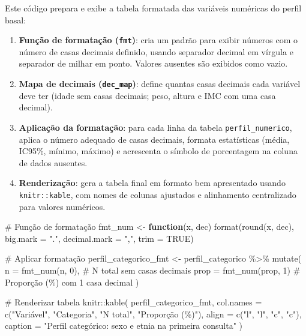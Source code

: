 \documentclass[
]{article}
\newenvironment{Shaded}{\begin{snugshade}}{\end{snugshade}}
\newcommand{\AttributeTok}[1]{\textcolor[rgb]{0.40,0.45,0.13}{#1}}
\newcommand{\CommentTok}[1]{\textcolor[rgb]{0.37,0.37,0.37}{#1}}
\newcommand{\ConstantTok}[1]{\textcolor[rgb]{0.56,0.35,0.01}{#1}}
\newcommand{\ControlFlowTok}[1]{\textcolor[rgb]{0.00,0.23,0.31}{\textbf{#1}}}
\newcommand{\DecValTok}[1]{\textcolor[rgb]{0.68,0.00,0.00}{#1}}
\newcommand{\FunctionTok}[1]{\textcolor[rgb]{0.28,0.35,0.67}{#1}}
\newcommand{\NormalTok}[1]{\textcolor[rgb]{0.00,0.23,0.31}{#1}}
\newcommand{\OtherTok}[1]{\textcolor[rgb]{0.00,0.23,0.31}{#1}}
\newcommand{\SpecialCharTok}[1]{\textcolor[rgb]{0.37,0.37,0.37}{#1}}
\newcommand{\StringTok}[1]{\textcolor[rgb]{0.13,0.47,0.30}{#1}}
\begin{document}
Este código prepara e exibe a tabela formatada das variáveis numéricas
do perfil basal:

\begin{enumerate}
\def\labelenumi{\arabic{enumi}.}
\item
  \textbf{Função de formatação (\texttt{fmt})}: cria um padrão para
  exibir números com o número de casas decimais definido, usando
  separador decimal em vírgula e separador de milhar em ponto. Valores
  ausentes são exibidos como vazio.
\item
  \textbf{Mapa de decimais (\texttt{dec\_map})}: define quantas casas
  decimais cada variável deve ter (idade sem casas decimais; peso,
  altura e IMC com uma casa decimal).
\item
  \textbf{Aplicação da formatação}: para cada linha da tabela
  \texttt{perfil\_numerico}, aplica o número adequado de casas decimais,
  formata estatísticas (média, IC95\%, mínimo, máximo) e acrescenta o
  símbolo de porcentagem na coluna de dados ausentes.
\item
  \textbf{Renderização}: gera a tabela final em formato bem apresentado
  usando \texttt{knitr::kable}, com nomes de colunas ajustados e
  alinhamento centralizado para valores numéricos.
\end{enumerate}

\begin{Shaded}
\begin{Highlighting}[]
\CommentTok{\# Função de formatação}
\NormalTok{fmt\_num }\OtherTok{\textless{}{-}} \ControlFlowTok{function}\NormalTok{(x, dec) }\FunctionTok{format}\NormalTok{(}\FunctionTok{round}\NormalTok{(x, dec), }\AttributeTok{big.mark =} \StringTok{"."}\NormalTok{, }\AttributeTok{decimal.mark =} \StringTok{","}\NormalTok{, }\AttributeTok{trim =} \ConstantTok{TRUE}\NormalTok{)}

\CommentTok{\# Aplicar formatação}
\NormalTok{perfil\_categorico\_fmt }\OtherTok{\textless{}{-}}\NormalTok{ perfil\_categorico }\SpecialCharTok{\%\textgreater{}\%}
  \FunctionTok{mutate}\NormalTok{(}
    \AttributeTok{n    =} \FunctionTok{fmt\_num}\NormalTok{(n, }\DecValTok{0}\NormalTok{),   }\CommentTok{\# N total sem casas decimais}
    \AttributeTok{prop =} \FunctionTok{fmt\_num}\NormalTok{(prop, }\DecValTok{1}\NormalTok{) }\CommentTok{\# Proporção (\%) com 1 casa decimal}
\NormalTok{  )}

\CommentTok{\# Renderizar tabela}
\NormalTok{knitr}\SpecialCharTok{::}\FunctionTok{kable}\NormalTok{(}
\NormalTok{  perfil\_categorico\_fmt,}
  \AttributeTok{col.names =} \FunctionTok{c}\NormalTok{(}\StringTok{"Variável"}\NormalTok{, }\StringTok{"Categoria"}\NormalTok{, }\StringTok{"N total"}\NormalTok{, }\StringTok{"Proporção (\%)"}\NormalTok{),}
  \AttributeTok{align =} \FunctionTok{c}\NormalTok{(}\StringTok{"l"}\NormalTok{, }\StringTok{"l"}\NormalTok{, }\StringTok{"c"}\NormalTok{, }\StringTok{"c"}\NormalTok{),}
  \AttributeTok{caption =} \StringTok{"Perfil categórico: sexo e etnia na primeira consulta"}
\NormalTok{)}
\end{Highlighting}
\end{Shaded}
\end{document}
